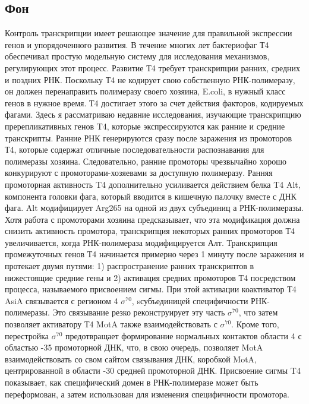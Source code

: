 \documentclass[a4paper,12pt]{article}
\begin{document}
    \subsection{Фон}
        \par{Контроль транскрипции имеет решающее значение для правильной экспрессии генов и упорядоченного развития. В течение
        многих лет бактериофаг Т4 обеспечивал простую модельную систему для исследования механизмов, регулирующих этот
        процесс. Развитие Т4 требует транскрипции ранних, средних и поздних РНК. Поскольку Т4 не кодирует свою собственную
        РНК-полимеразу, он должен перенаправить полимеразу своего хозяина, E.coli, в нужный класс генов в нужное время. Т4
        достигает этого за счет действия факторов, кодируемых фагами. Здесь я рассматриваю недавние исследования, изучающие
        транскрипцию пререпликативных генов T4, которые экспрессируются как ранние и средние транскрипты. Ранние РНК
        генерируются сразу после заражения из промоторов Т4, которые содержат отличные последовательности распознавания для
        полимеразы хозяина. Следовательно, ранние промоторы чрезвычайно хорошо конкурируют с промоторами-хозяевами за
        доступную полимеразу. Ранняя промоторная активность T4 дополнительно усиливается действием белка T4 Alt, компонента
        головки фага, который вводится в кишечную палочку вместе с ДНК фага. Alt модифицирует Arg265 на одной из двух
        субъединиц а РНК-полимеразы. Хотя работа с промоторами хозяина предсказывает, что эта модификация должна снизить
        активность промотора, транскрипция некоторых ранних промоторов Т4 увеличивается, когда РНК-полимераза модифицируется
        Алт. Транскрипция промежуточных генов Т4 начинается примерно через 1 минуту после заражения и протекает двумя путями:
        1) распространение ранних транскриптов в нижестоящие средние гены и 2) активация средних промоторов Т4 посредством
        процесса, называемого присвоением сигмы. При этой активации коактиватор Т4 AsiA связывается с регионом 4
        \(\sigma^{70}\), sсубъединицей специфичности РНК-полимеразы. Это связывание резко реконструирует эту часть
        \(\sigma^{70}\), что затем позволяет активатору Т4 MotA также взаимодействовать с \(\sigma^{70}\). Кроме того,
        перестройка \(\sigma^{70}\) предотвращает формирование нормальных контактов области 4 с областью -35 промоторной ДНК,
        что, в свою очередь, позволяет MotA взаимодействовать со свом сайтом связывания ДНК, коробкой MotA, центрированной в
        области -30 средней промоторной ДНК. Присвоение сигмы T4 показывает, как специфический домен в РНК-полимеразе может
        быть переформован, а затем использован для изменения специфичности промотора. \cite{hinton}}
\end{document}
